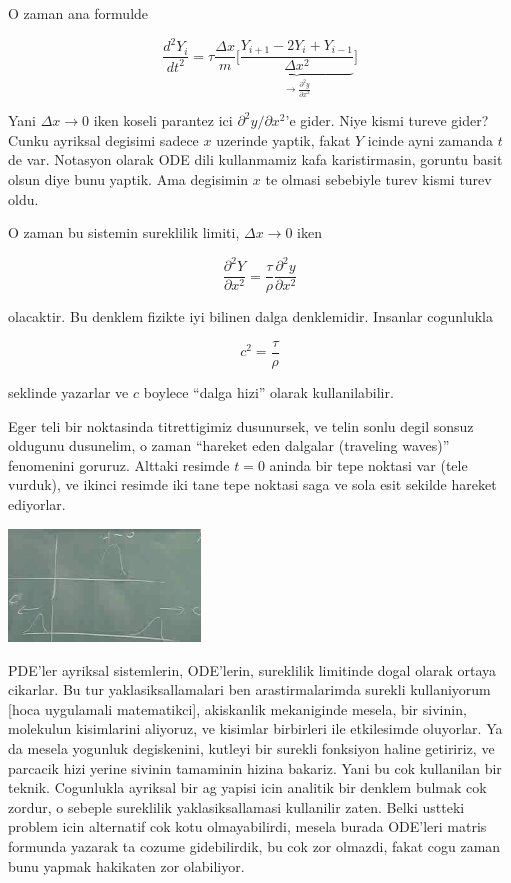 \documentclass[12pt,fleqn]{article}
\begin{document}
O zaman ana formulde

\[ \frac{d^2Y_i}{dt^2} = 
\tau \frac{\Delta x}{m} \bigg[\underbrace{
\frac{Y_{i+1} - 2Y_i + Y_{i-1}}{\Delta x^2}
}_{\to \frac{\partial ^2y}{\partial x^2}}
\bigg]
\]

Yani $\Delta x \to 0$ iken koseli parantez ici $\partial ^2y/\partial
x^2$'e gider. Niye kismi tureve gider? Cunku ayriksal degisimi sadece $x$
uzerinde yaptik, fakat $Y$ icinde ayni zamanda $t$ de var. Notasyon olarak
ODE dili kullanmamiz kafa karistirmasin, goruntu basit olsun diye bunu
yaptik. Ama degisimin $x$ te olmasi sebebiyle turev kismi turev oldu. 

O zaman bu sistemin sureklilik limiti, $\Delta x \to 0$ iken

\[ 
\frac{\partial ^2Y}{\partial x^2} = 
\frac{\tau}{\rho}\frac{\partial ^2y}{\partial x^2}
 \]

olacaktir. Bu denklem fizikte iyi bilinen dalga denklemidir. Insanlar
cogunlukla 

\[ c^2 = \frac{\tau}{\rho} \]

seklinde yazarlar ve $c$ boylece ``dalga hizi'' olarak kullanilabilir. 

Eger teli bir noktasinda titrettigimiz dusunursek, ve telin sonlu degil
sonsuz oldugunu dusunelim, o zaman ``hareket eden dalgalar (traveling
waves)'' fenomenini goruruz. Alttaki resimde $t=0$ aninda bir tepe noktasi
var (tele vurduk), ve ikinci resimde iki tane tepe noktasi saga ve sola
esit sekilde hareket ediyorlar. 

\includegraphics[height=3cm]{1_10.png}

PDE'ler ayriksal sistemlerin, ODE'lerin, sureklilik limitinde dogal olarak
ortaya cikarlar. Bu tur yaklasiksallamalari ben arastirmalarimda surekli
kullaniyorum [hoca uygulamali matematikci], akiskanlik mekaniginde mesela,
bir sivinin, molekulun kisimlarini aliyoruz, ve kisimlar birbirleri ile
etkilesimde oluyorlar. Ya da mesela yogunluk degiskenini, kutleyi bir
surekli fonksiyon haline getiririz, ve parcacik hizi yerine sivinin
tamaminin hizina bakariz. Yani bu cok kullanilan bir teknik. Cogunlukla
ayriksal bir ag yapisi icin analitik bir denklem bulmak cok zordur, o
sebeple sureklilik yaklasiksallamasi kullanilir zaten. Belki ustteki
problem icin alternatif cok kotu olmayabilirdi, mesela burada ODE'leri
matris formunda yazarak ta cozume gidebilirdik, bu cok zor olmazdi, fakat
cogu zaman bunu yapmak hakikaten zor olabiliyor.
\end{document}
